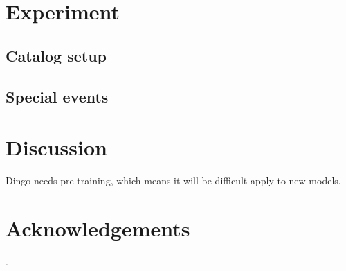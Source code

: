 \documentclass[twocolumn]{aastex631}
\begin{document}
\section{Experiment}

\subsection{Catalog setup}


\subsection{Special events}

\section{Discussion}






Dingo needs pre-training, which means it will be difficult apply to new models.



\section{Acknowledgements}

\citep{Luger2021}.


\end{document}
